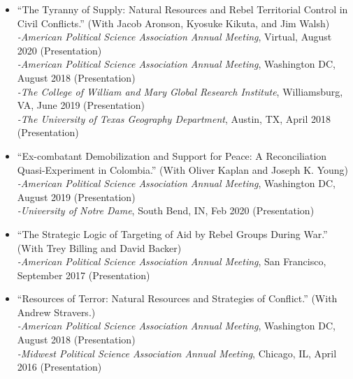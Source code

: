 \documentclass[10pt]{article}
\begin{document}
\begin{itemize}
\item ``The Tyranny of Supply: Natural Resources and Rebel Territorial Control in Civil Conflicts.'' (With Jacob Aronson, Kyosuke Kikuta, and Jim Walsh)
\\ \indent \textit{-American Political Science Association Annual Meeting}, Virtual, August 2020 (Presentation)
\\ \indent \textit{-American Political Science Association Annual Meeting}, Washington DC, August 2018 (Presentation)
\\ \indent \textit{-The College of William and Mary Global Research Institute}, Williamsburg, VA, June 2019 (Presentation)
\\ \indent \textit{-The University of Texas Geography Department}, Austin, TX, April 2018 (Presentation)


\item ``Ex-combatant Demobilization and Support for Peace: A Reconciliation Quasi-Experiment in Colombia.'' (With Oliver Kaplan and Joseph K. Young)
\\ \indent \textit{-American Political Science Association Annual Meeting}, Washington DC, August 2019 (Presentation)
\\ \indent \textit{-University of Notre Dame}, South Bend, IN, Feb 2020 (Presentation)



\item ``The Strategic Logic of Targeting of Aid by Rebel Groups During War.'' (With Trey Billing and David Backer)
\\ \indent \textit{-American Political Science Association Annual Meeting}, San Francisco, September 2017 (Presentation)

\item ``Resources of Terror: Natural Resources and Strategies of Conflict.'' (With Andrew Stravers.) 
	\\ \indent \textit{-American Political Science Association Annual Meeting}, Washington DC, August 2018 (Presentation)
	\\ \indent \textit{-Midwest Political Science Association Annual Meeting}, Chicago, IL, April 2016 (Presentation)


\end{itemize}
\end{document}
